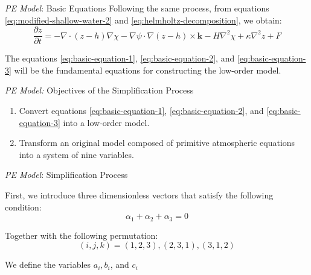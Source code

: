 \begin{frame}{\textit{PE Model}: Basic Equations}
	Following the same process, from equations \eqref{eq:modified-shallow-water-2} and \eqref{eq:helmholtz-decomposition}, we obtain:
	\begin{equation}
		\frac{\partial z}{\partial t} = -\nabla \cdot (z - h)\nabla \chi - \nabla \psi \cdot \nabla(z - h) \times \mathbf{k} - H\nabla^2\chi + \kappa\nabla^2z + F \label{eq:basic-equation-3}
	\end{equation}
	
	The equations \eqref{eq:basic-equation-1}, \eqref{eq:basic-equation-2}, and \eqref{eq:basic-equation-3} will be the fundamental equations for constructing the low-order model.
\end{frame}


\begin{frame}{\textit{PE Model:} Objectives of the Simplification Process}
	
	\begin{enumerate}
		\item Convert equations \eqref{eq:basic-equation-1}, \eqref{eq:basic-equation-2}, and \eqref{eq:basic-equation-3} into a low-order model.
		\item Transform an original model composed of primitive atmospheric equations into a system of nine variables.
	\end{enumerate}
	    
\end{frame}


\begin{frame}{\textit{PE Model}: Simplification Process}
	
	First, we introduce three dimensionless vectors that satisfy the following condition:
	\begin{equation}
		\alpha_1 + \alpha_2 + \alpha_3 = 0
	\end{equation}
	
	Together with the following permutation:
	\begin{equation}
		(i, j, k) = (1,2,3), (2,3,1), (3,1,2) \label{eq:permutation}
	\end{equation}
	
	We define the variables $a_i, b_i$, and $c_i$
\end{frame}


